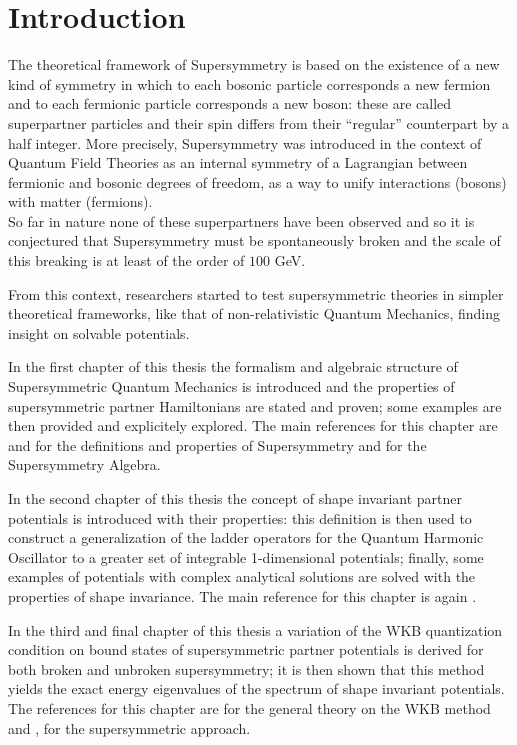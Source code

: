 \chapter*{Introduction}
The theoretical framework of Supersymmetry is based on the existence of a 
new kind of symmetry in which to each bosonic particle
corresponds a new fermion and to each fermionic particle corresponds a new boson:
these are called superpartner particles and their spin differs from their
``regular'' counterpart by a half integer. More precisely, Supersymmetry was
introduced in the context of Quantum Field Theories as an internal symmetry
of a Lagrangian between fermionic and bosonic degrees of freedom, as a way to
unify interactions (bosons) with matter (fermions).\\
So far in nature none of these superpartners have been observed and so
it is conjectured that Supersymmetry must be spontaneously broken and
the scale of this breaking is at least of the order of $100$ GeV.

From this context, researchers started to test supersymmetric theories in
simpler theoretical frameworks, like that of non-relativistic Quantum
Mechanics, finding insight on solvable potentials.

In the first chapter of this thesis the formalism and algebraic structure of
Supersymmetric Quantum Mechanics is introduced and the properties of
supersymmetric partner Hamiltonians are stated and proven; some examples
are then provided and explicitely explored. The main references for this
chapter are \cite{cooper_main} and \cite{khare_short} for the definitions and
properties of Supersymmetry and \cite{bastianelli} for the Supersymmetry
Algebra.

In the second chapter of this thesis the concept of shape invariant partner
potentials is introduced with their properties: this definition is then used
to construct a generalization of the ladder operators for the Quantum Harmonic
Oscillator to a greater set of integrable 1-dimensional potentials; finally, some
examples of potentials with complex analytical solutions are solved with the
properties of shape invariance. The main reference for this chapter is again
\cite{cooper_main}. 

In the third and final chapter of this thesis a variation
of the WKB quantization condition on bound states of supersymmetric 
partner potentials is derived for both broken and unbroken supersymmetry; it is
then shown that this method yields the exact energy eigenvalues of the spectrum
of shape invariant potentials. The references for this chapter are \cite{zwiebach}
for the general theory on the WKB method and \cite{cooper_main}, \cite{dutt_swkb}
for the supersymmetric approach.
